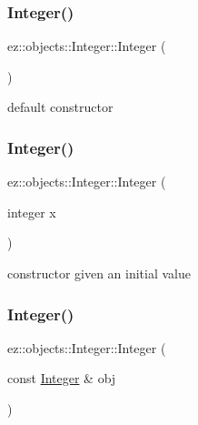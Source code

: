 \subsubsection{\texorpdfstring{Integer()}{Integer()}\hspace{0.1cm}{\footnotesize\ttfamily [1/3]}}
{\footnotesize\ttfamily ez\+::objects\+::\+Integer\+::\+Integer (\begin{DoxyParamCaption}{ }\end{DoxyParamCaption})\hspace{0.3cm}{\ttfamily [inline]}}

default constructor \mbox{\label{classez_1_1objects_1_1Integer_abbfeeb57ba1420103085e186c1aedb75}} 
\subsubsection{\texorpdfstring{Integer()}{Integer()}\hspace{0.1cm}{\footnotesize\ttfamily [2/3]}}
{\footnotesize\ttfamily ez\+::objects\+::\+Integer\+::\+Integer (\begin{DoxyParamCaption}\item[{integer}]{x }\end{DoxyParamCaption})\hspace{0.3cm}{\ttfamily [inline]}}

constructor given an initial value \mbox{\label{classez_1_1objects_1_1Integer_a0c7e18a60b0f3ecef05be8c969fcebc9}} 
\subsubsection{\texorpdfstring{Integer()}{Integer()}\hspace{0.1cm}{\footnotesize\ttfamily [3/3]}}
{\footnotesize\ttfamily ez\+::objects\+::\+Integer\+::\+Integer (\begin{DoxyParamCaption}\item[{const \hyperlink{classez_1_1objects_1_1Integer}{Integer} \&}]{obj }\end{DoxyParamCaption})\hspace{0.3cm}{\ttfamily [inline]}}


